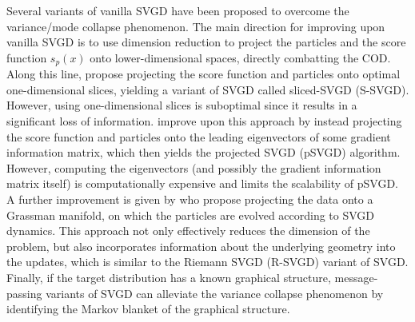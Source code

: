 Several variants of vanilla SVGD have been proposed to overcome the variance/mode collapse phenomenon. The main direction for improving upon vanilla SVGD is to use dimension reduction to project the particles and the score function $s_p(x)$ onto lower-dimensional spaces, directly combatting the COD. Along this line, \citet{gong_sliced_ksd} propose projecting the score function and particles onto optimal one-dimensional slices, yielding a variant of SVGD called sliced-SVGD (S-SVGD). However, using one-dimensional slices is suboptimal since it results in a significant loss of information. \citet{chen_projected_svgd} improve upon this approach by instead projecting the score function and particles onto the leading eigenvectors of some gradient information matrix, which then yields the projected SVGD (pSVGD) algorithm. However, computing the eigenvectors (and possibly the gradient information matrix itself) is computationally expensive and limits the scalability of pSVGD. A further improvement is given by \cite{liu_grassman_svgd} who propose projecting the data onto a Grassman manifold, on which the particles are evolved according to SVGD dynamics. This approach not only effectively reduces the dimension of the problem, but also incorporates information about the underlying geometry into the updates, which is similar to the Riemann SVGD (R-SVGD) \citep{liu_riemann_svgd} variant of SVGD. Finally, if the target distribution has a known graphical structure, message-passing variants of SVGD \citep[e.g.,][]{zhuo_mp_svgd, zhou_aump_svgd} can alleviate the variance collapse phenomenon by identifying the Markov blanket of the graphical structure.





